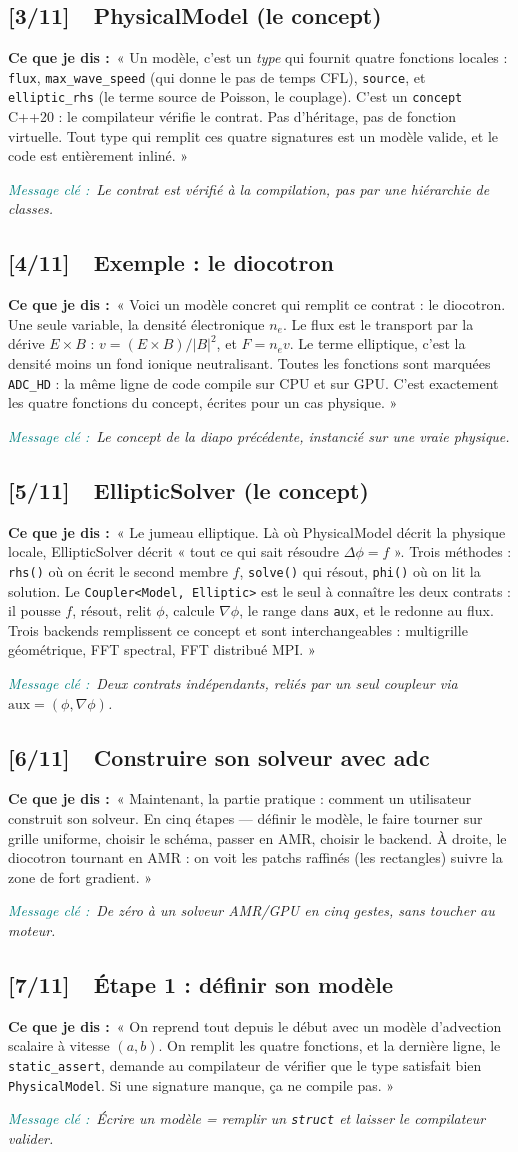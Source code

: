 \documentclass[11pt]{article}
\newcommand{\slidetag}[2]{\subsection{\textcolor{lpp}{[#1]}\ \ #2}}
\newcommand{\dit}[1]{\par\smallskip\textbf{Ce que je dis :}\ #1}
\newcommand{\msg}[1]{\par\textit{\textcolor{teal}{Message clé :}}\ \textit{#1}}
\newcommand{\code}[1]{\texttt{\small #1}}
\begin{document}
\slidetag{3/11}{PhysicalModel (le concept)}
\dit{« Un modèle, c'est un \emph{type} qui fournit quatre fonctions locales : \code{flux},
\code{max\_wave\_speed} (qui donne le pas de temps CFL), \code{source}, et
\code{elliptic\_rhs} (le terme source de Poisson, le couplage). C'est un \code{concept}
C++20 : le compilateur vérifie le contrat. Pas d'héritage, pas de fonction virtuelle.
Tout type qui remplit ces quatre signatures est un modèle valide, et le code est
entièrement inliné. »}
\msg{Le contrat est vérifié à la compilation, pas par une hiérarchie de classes.}

\slidetag{4/11}{Exemple : le diocotron}
\dit{« Voici un modèle concret qui remplit ce contrat : le diocotron. Une seule variable,
la densité électronique $n_e$. Le flux est le transport par la dérive $E\times B$ :
$v = (E\times B)/|B|^2$, et $F = n_e v$. Le terme elliptique, c'est la densité moins un
fond ionique neutralisant. Toutes les fonctions sont marquées \code{ADC\_HD} : la même
ligne de code compile sur CPU et sur GPU. C'est exactement les quatre fonctions du
concept, écrites pour un cas physique. »}
\msg{Le concept de la diapo précédente, instancié sur une vraie physique.}

\slidetag{5/11}{EllipticSolver (le concept)}
\dit{« Le jumeau elliptique. Là où PhysicalModel décrit la physique locale,
EllipticSolver décrit « tout ce qui sait résoudre $\Delta\phi = f$ ». Trois méthodes :
\code{rhs()} où on écrit le second membre $f$, \code{solve()} qui résout, \code{phi()}
où on lit la solution. Le \code{Coupler<Model, Elliptic>} est le seul à connaître les
deux contrats : il pousse $f$, résout, relit $\phi$, calcule $\nabla\phi$, le range dans
\code{aux}, et le redonne au flux. Trois backends remplissent ce concept et sont
interchangeables : multigrille géométrique, FFT spectral, FFT distribué MPI. »}
\msg{Deux contrats indépendants, reliés par un seul coupleur via $\mathrm{aux}=(\phi,\nabla\phi)$.}

\slidetag{6/11}{Construire son solveur avec adc}
\dit{« Maintenant, la partie pratique : comment un utilisateur construit son solveur. En
cinq étapes — définir le modèle, le faire tourner sur grille uniforme, choisir le schéma,
passer en AMR, choisir le backend. À droite, le diocotron tournant en AMR : on voit les
patchs raffinés (les rectangles) suivre la zone de fort gradient. »}
\msg{De zéro à un solveur AMR/GPU en cinq gestes, sans toucher au moteur.}

\slidetag{7/11}{Étape 1 : définir son modèle}
\dit{« On reprend tout depuis le début avec un modèle d'advection scalaire à vitesse
$(a,b)$. On remplit les quatre fonctions, et la dernière ligne, le \code{static\_assert},
demande au compilateur de vérifier que le type satisfait bien \code{PhysicalModel}. Si une
signature manque, ça ne compile pas. »}
\msg{Écrire un modèle = remplir un \code{struct} et laisser le compilateur valider.}
\end{document}
